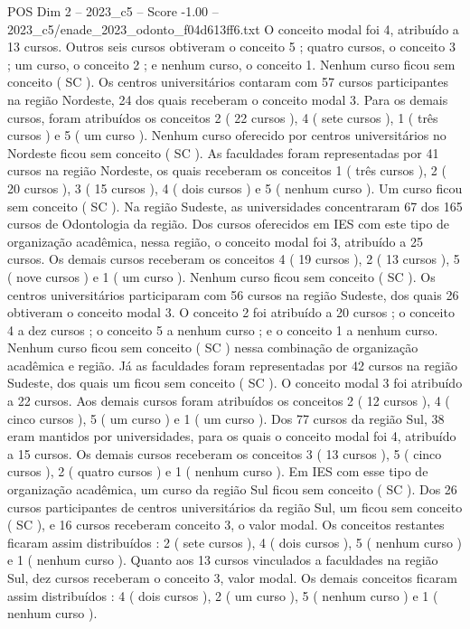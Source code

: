 \begin{textsample}{POS Dim 2 – 2023\_c5 – Score -1.00 – 2023\_c5/enade\_2023\_odonto\_f04d613ff6.txt}
O conceito modal foi 4, atribuído a 13 cursos.
Outros seis cursos obtiveram o conceito 5 ; quatro cursos, o conceito 3 ; um curso, o conceito 2 ; e nenhum curso, o conceito 1.
Nenhum curso ficou sem conceito ( SC ).
Os centros universitários contaram com 57 cursos participantes na região Nordeste, 24 dos quais receberam o conceito modal 3.
Para os demais cursos, foram atribuídos os conceitos 2 ( 22 cursos ), 4 ( sete cursos ), 1 ( três cursos ) e 5 ( um curso ).
Nenhum curso oferecido por centros universitários no Nordeste ficou sem conceito ( SC ).
As faculdades foram representadas por 41 cursos na região Nordeste, os quais receberam os conceitos 1 ( três cursos ), 2 ( 20 cursos ), 3 ( 15 cursos ), 4 ( dois cursos ) e 5 ( nenhum curso ).
Um curso ficou sem conceito ( SC ).
Na região Sudeste, as universidades concentraram 67 dos 165 cursos de Odontologia da região.
Dos cursos oferecidos em IES com este tipo de organização acadêmica, nessa região, o conceito modal foi 3, atribuído a 25 cursos.
Os demais cursos receberam os conceitos 4 ( 19 cursos ), 2 ( 13 cursos ), 5 ( nove cursos ) e 1 ( um curso ).
Nenhum curso ficou sem conceito ( SC ).
Os centros universitários participaram com 56 cursos na região Sudeste, dos quais 26 obtiveram o conceito modal 3.
O conceito 2 foi atribuído a 20 cursos ; o conceito 4 a dez cursos ; o conceito 5 a nenhum curso ; e o conceito 1 a nenhum curso.
Nenhum curso ficou sem conceito ( SC ) nessa combinação de organização acadêmica e região.
Já as faculdades foram representadas por 42 cursos na região Sudeste, dos quais um ficou sem conceito ( SC ).
O conceito modal 3 foi atribuído a 22 cursos.
Aos demais cursos foram atribuídos os conceitos 2 ( 12 cursos ), 4 ( cinco cursos ), 5 ( um curso ) e 1 ( um curso ).
Dos 77 cursos da região Sul, 38 eram mantidos por universidades, para os quais o conceito modal foi 4, atribuído a 15 cursos.
Os demais cursos receberam os conceitos 3 ( 13 cursos ), 5 ( cinco cursos ), 2 ( quatro cursos ) e 1 ( nenhum curso ).
Em IES com esse tipo de organização acadêmica, um curso da região Sul ficou sem conceito ( SC ).
Dos 26 cursos participantes de centros universitários da região Sul, um ficou sem conceito ( SC ), e 16 cursos receberam conceito 3, o valor modal.
Os conceitos restantes ficaram assim distribuídos : 2 ( sete cursos ), 4 ( dois cursos ), 5 ( nenhum curso ) e 1 ( nenhum curso ).
Quanto aos 13 cursos vinculados a faculdades na região Sul, dez cursos receberam o conceito 3, valor modal.
Os demais conceitos ficaram assim distribuídos : 4 ( dois cursos ), 2 ( um curso ), 5 ( nenhum curso ) e 1 ( nenhum curso ).

\end{textsample}
